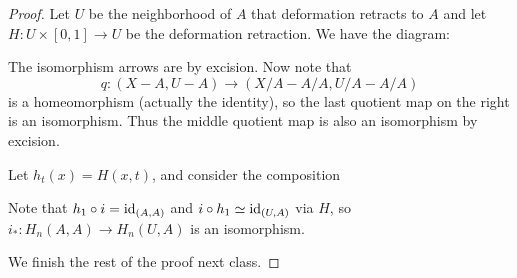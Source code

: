 \begin{proof}
  Let $U$ be the neighborhood of $A$ that deformation
  retracts to $A$ and let $H : U \times [0, 1] \to U$
  be the deformation retraction. We have the
  diagram:
  \begin{center}
  \end{center}
  The isomorphism arrows are by excision. Now note
  that
  \[
    q : (X - A, U - A) \to (X / A - A / A, U / A - A / A)
  \]
  is a homeomorphism (actually the identity), so
  the last quotient map on the right is an isomorphism.
  Thus the middle quotient map is also an isomorphism
  by excision.

  Let $h_t(x) = H(x, t)$, and consider the composition
  \begin{center}
  \end{center}
  Note that $h_1 \circ i = \operatorname{id}_{(A, A)}$ and
  $i \circ h_1 \simeq \operatorname{id}_{(U, A)}$ via $H$, so
  $i_* : H_n(A, A) \to H_n(U, A)$ is an isomorphism.

  We finish the rest of the proof next class.
\end{proof}
